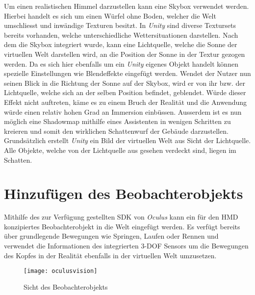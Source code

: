 Um einen realistischen Himmel darzustellen kann eine Skybox verwendet werden. Hierbei handelt es sich um einen Würfel ohne Boden, welcher die Welt umschliesst und inwändige Texturen besitzt. In \textit{Unity} sind diverse Textursets bereits vorhanden, welche unterschiedliche Wettersituationen darstellen. Nach dem die Skybox integriert wurde, kann eine Lichtquelle, welche die Sonne der virtuellen Welt darstellen wird, an die Position der Sonne in der Textur gezogen werden. Da es sich hier ebenfalls um ein \textit{Unity} eigenes Objekt handelt können spezielle Einstellungen wie Blendeffekte eingefügt werden. Wendet der Nutzer nun seinen Blick in die Richtung der Sonne auf der Skybox, wird er von ihr bzw. der Lichtquelle, welche sich an der selben Position befindet, geblendet. Würde dieser Effekt nicht auftreten, käme es zu einem Bruch der Realität und die Anwendung würde einen relativ hohen Grad an Immersion einbüssen. Ausserdem ist es nun möglich eine Shadowmap mithilfe eines Assistenten in wenigen Schritten zu kreieren und somit den wirklichen Schattenwurf der Gebäude darzustellen. Grundsätzlich erstellt \textit{Unity} ein Bild der virtuellen Welt aus Sicht der Lichtquelle. Alle Objekte, welche von der Lichtquelle aus gesehen verdeckt sind, liegen im Schatten.\\[6pt]


\section{Hinzufügen des Beobachterobjekts}\label{s.ovr}
Mithilfe des zur Verfügung gestellten SDK von \textit{Oculus} kann ein für den HMD konzipiertes Beobachterobjekt in die Welt eingefügt werden. Es verfügt bereits über grundlegende Bewegungen wie Springen, Laufen oder Rennen und verwendet die Informationen des integrierten 3-DOF Sensors um die Bewegungen des Kopfes in der Realität ebenfalls in der virtuellen Welt umzusetzen.\\[6pt]

\begin{figure}[htb]
	\vspace{-20pt}
	\begin{center}
		\texttt{[image: oculusvision]}
	\end{center}
	\vspace{-15pt}
	\caption{Sicht des Beobachterobjekts}\label{oculusvision}
	\vspace{-12pt}
\end{figure}

